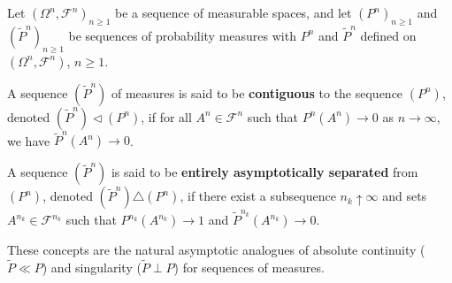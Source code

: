 Let $(\Omega^n, \mathcal{F}^n)_{n \geq 1}$ be a sequence of measurable spaces, and let $(P^n)_{n \geq 1}$ and $(\tilde{P}^n)_{n \geq 1}$ be sequences of probability measures with $P^n$ and $\tilde{P}^n$ defined on $(\Omega^n, \mathcal{F}^n)$, $n \geq 1$.

A sequence $(\tilde{P}^n)$ of measures is said to be \textbf{contiguous} to the sequence $(P^n)$, denoted $(\tilde{P}^n) \triangleleft (P^n)$, if for all $A^n \in \mathcal{F}^n$ such that $P^n(A^n) \to 0$ as $n \to \infty$, we have $\tilde{P}^n(A^n) \to 0$.

A sequence $(\tilde{P}^n)$ is said to be \textbf{entirely asymptotically separated} from $(P^n)$, denoted $(\tilde{P}^n) \triangle (P^n)$, if there exist a subsequence $n_k \uparrow \infty$ and sets $A^{n_k} \in \mathcal{F}^{n_k}$ such that $P^{n_k}(A^{n_k}) \to 1$ and $\tilde{P}^{n_k}(A^{n_k}) \to 0$.

These concepts are the natural asymptotic analogues of absolute continuity ($\tilde{P} \ll P$) and singularity ($\tilde{P} \perp P$) for sequences of measures.

